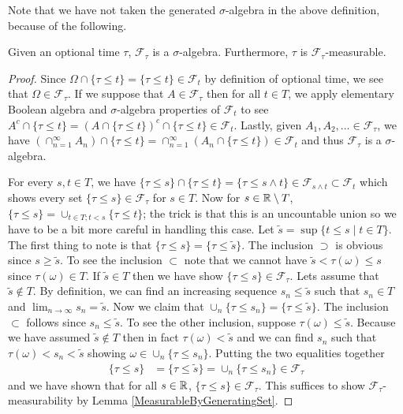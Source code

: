  Note that we have not taken the generated $\sigma$-algebra in the
above definition, because of the following.
\begin{lem}Given an optional time $\tau$, $\mathcal{F}_\tau$ is a
  $\sigma$-algebra.  Furthermore, $\tau$ is $\mathcal{F}_\tau$-measurable.
\end{lem}
\begin{proof}Since $\Omega \cap \lbrace \tau \leq t \rbrace  = \lbrace
  \tau \leq t \rbrace \in \mathcal{F}_t$ by definition of optional
  time, we see that $\Omega \in \mathcal{F}_\tau$.  If we suppose that
  $A \in \mathcal{F}_\tau$ then for all $t \in T$, we apply elementary
  Boolean  algebra and $\sigma$-algebra properties of $\mathcal{F}_t$ to see $A^c \cap \lbrace
  \tau \leq t \rbrace = (A \cap \lbrace
  \tau \leq t \rbrace)^c \cap \lbrace
  \tau \leq t \rbrace \in \mathcal{F}_t$.  Lastly, given $A_1, A_2,
  \dots \in \mathcal{F}_\tau$, we have $(\cap_{n=1}^\infty A_n)
  \cap \lbrace
  \tau \leq t \rbrace = \cap_{n=1}^\infty (A_n
  \cap \lbrace
  \tau \leq t \rbrace ) \in \mathcal{F}_t$ and thus $\mathcal{F}_\tau$
  is a $\sigma$-algebra.

For every $s,t \in T$, we have 
$\lbrace \tau \leq s \rbrace \cap \lbrace \tau \leq t \rbrace =
\lbrace \tau \leq s \wedge t \rbrace \in \mathcal{F}_{s \wedge t}
\subset \mathcal{F}_t$ which shows every set $\lbrace \tau \leq s
\rbrace \in \mathcal{F}_\tau$ for $s \in T$.  Now for $s \in \mathbb{R}
\setminus T$,
$\lbrace \tau \leq s \rbrace = \cup_{t \in T ; t < s} \lbrace \tau
\leq t \rbrace$; the trick is that this is an uncountable
union so we have to be a bit more careful in handling this
case.  Let $\tilde{s} = \sup \lbrace t \leq s \mid t \in T \rbrace$.  The
first thing to note is that $\lbrace \tau \leq s \rbrace = \lbrace
\tau \leq \tilde{s} \rbrace$.  The inclusion $\supset$ is obvious
since $s \geq \tilde{s}$.  To see the inclusion $\subset$ note that we
cannot have $\tilde{s} < \tau(\omega) \leq s$ since $\tau(\omega) \in
T$.  If $\tilde{s} \in T$ then we have show $\lbrace \tau \leq s
\rbrace \in \mathcal{F}_\tau$.  Lets assume that $\tilde{s} \notin T$.
By definition, we can find an increasing sequence $s_n \leq \tilde{s}$
such that $s_n \in T$ and $\lim_{n
  \to \infty} s_n = \tilde{s}$.  Now we claim that $\cup_n \lbrace \tau \leq
s_n \rbrace = \lbrace \tau \leq \tilde{s} \rbrace$.  The inclusion
$\subset$ follows since $s_n \leq \tilde{s}$.  To see the other
inclusion, suppose $\tau(\omega) \leq \tilde{s}$.  Because we have
assumed $\tilde{s} \notin T$ then in fact $\tau(\omega) < \tilde{s}$
and we can find $s_n$ such that $\tau(\omega) < s_n < \tilde{s}$
showing $\omega \in \cup_n \lbrace \tau \leq
s_n \rbrace$.  Putting the two equalities together
\begin{align*}
\lbrace \tau \leq s \rbrace &= \lbrace \tau \leq \tilde{s} \rbrace =
\cup_n \lbrace \tau \leq s_n \rbrace \in \mathcal{F}_\tau
\end{align*}
and we have shown that for all $s \in \mathbb{R}$, $\lbrace \tau \leq s
\rbrace \in \mathcal{F}_\tau$.
This suffices to show $\mathcal{F}_\tau$-measurability by Lemma \ref{MeasurableByGeneratingSet}.
\end{proof}

